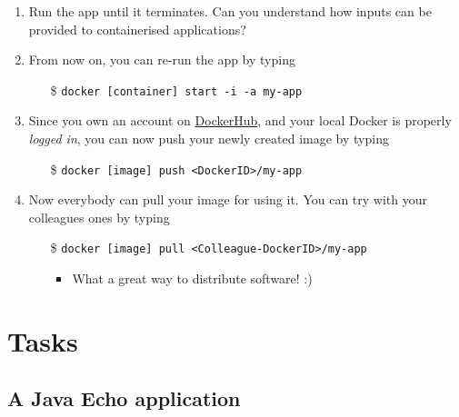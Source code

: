 \documentclass[handout]{beamer}\mode<presentation>{\usetheme{AMSCesenaBleu}}
\begin{document}
\begin{frame}[allowframebreaks]
\begin{enumerate}
        \item Run the app until it terminates. Can you understand how inputs can be provided to containerised applications?
        
        \framebreak
        
        \item From now on, you can re-run the app by typing
        \begin{itemize}
            \item[\$] \texttt{docker [container] \alert{start} -i -a my-app}
        \end{itemize}
        
        \item Since you own an account on \href{https://hub.docker.com/}{DockerHub}, and your local Docker is properly \emph{logged in}, you can now \alert{push} your newly created image by typing
        \begin{itemize}
            \item[\$] \texttt{docker [image] \alert{push} <DockerID>/my-app}
        \end{itemize}
        
        \item Now everybody can \alert{pull} your image for using it. You can try with your colleagues ones by typing 
        \begin{itemize}
            \item[\$] \texttt{docker [image] \alert{pull} <Colleague-DockerID>/my-app}
            \begin{itemize}
                \item What a great way to distribute software! :)
            \end{itemize}
        \end{itemize}
         
    \end{enumerate}
    

\end{frame}

\section{Tasks}

\subsection{A Java Echo application}
\end{document}
